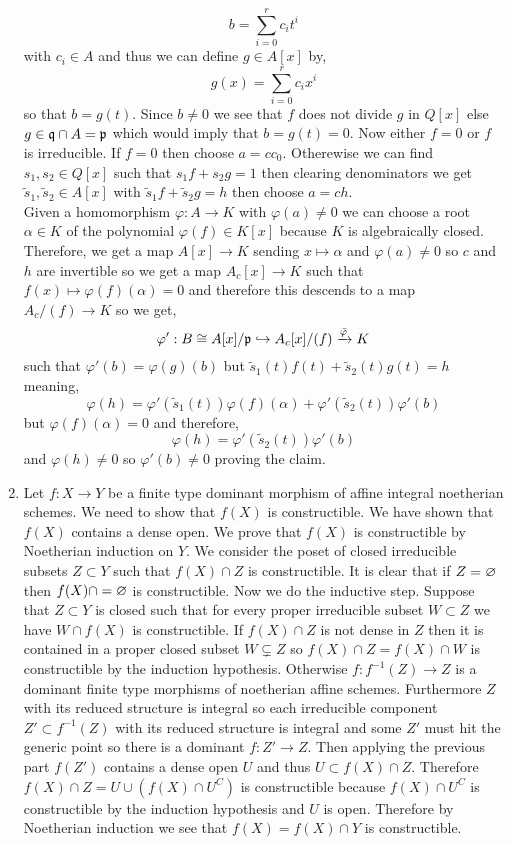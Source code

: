\documentclass[12pt]{article}
\begin{document}
\begin{enumerate}
\[ b = \sum_{i = 0}^r c_i t^i \]
with $c_i \in A$ and thus we can define $g \in A[x]$ by,
\[ g(x) = \sum_{i = 0}^r c_i x^i \]
so that $b = g(t)$. Since $b \neq 0$ we see that $f$ does not divide $g$ in $Q[x]$ else $g \in \mathfrak{q} \cap A = \mathfrak{p}$ which would imply that $b = g(t) = 0$. Now either $f = 0$ or $f$ is irreducible. If $f = 0$ then choose $a = c c_0$. Otherewise we can find $s_1, s_2 \in Q[x]$ such that $s_1 f + s_2 g = 1$ then clearing denominators we get $\tilde{s}_1, \tilde{s}_2 \in A[x]$ with $\tilde{s}_1 f + \tilde{s}_2 g = h$ then choose $a = ch$.
\bigskip\\
Given a homomorphism $\varphi : A \to K$ with $\varphi(a) \neq 0$ we can choose a root $\alpha \in K$ of the polynomial $\varphi(f) \in K[x]$ because $K$ is algebraically closed. Therefore, we get a map $A[x] \to K$ sending $x \mapsto \alpha$ and $\varphi(a) \neq 0$ so $c$ and $h$ are invertible so we get a map $A_c[x] \to K$ such that $f(x) \mapsto \varphi(f)(\alpha) = 0$ and therefore this descends to a map $A_c / (f) \to K$ so we get,
\[ \varphi' : B \cong A[x]/\mathfrak{p} \hookrightarrow A_c[x]/(f) \xrightarrow{\bar{\varphi}} K \]
such that $\varphi'(b) = \varphi(g)(b)$ but $\tilde{s}_1(t) f(t) + \tilde{s}_2(t) g(t) = h$ meaning,
\[ \varphi(h) = \varphi'(\tilde{s}_1(t)) \varphi(f)(\alpha) + \varphi'(\tilde{s}_2(t)) \varphi'(b) \]
but $\varphi(f)(\alpha) = 0$ and therefore,
\[ \varphi(h) = \varphi'(\tilde{s}_2(t)) \varphi'(b) \]
and $\varphi(h) \neq 0$ so $\varphi'(b) \neq 0$ proving the claim.

\item Let $f : X \to Y$ be a finite type dominant morphism of affine integral noetherian schemes. We need to show that $f(X)$ is constructible. We have shown that $f(X)$ contains a dense open. We prove that $f(X)$ is constructible by Noetherian induction on $Y$. We consider the poset of closed irreducible subsets $Z \subset Y$ such that $f(X) \cap Z$ is constructible. It is clear that if $Z = \varnothing$ then $f(X) \cap = \varnothing$ is constructible. Now we do the inductive step. Suppose that $Z \subset Y$ is closed such that for every proper irreducible subset $W \subset Z$ we have $W \cap f(X)$ is constructible. If $f(X) \cap Z$ is not dense in $Z$ then it is contained in a proper closed subset $W \subsetneq Z$ so $f(X) \cap Z = f(X) \cap W$ is constructible by the induction hypothesis. Otherwise $f : f^{-1}(Z) \to Z$ is a dominant finite type morphisms of noetherian affine schemes. Furthermore $Z$ with its reduced structure is integral so each irreducible component $Z' \subset f^{-1}(Z)$ with its reduced structure is integral and some $Z'$ must hit the generic point so there is a dominant $f : Z' \to Z$. Then applying the previous part $f(Z')$ contains a dense open $U$ and thus $U \subset f(X) \cap Z$. Therefore $f(X) \cap Z = U \cup (f(X) \cap U^C)$ is constructible because $f(X) \cap U^C$ is constructible by the induction hypothesis and $U$ is open. Therefore by Noetherian induction we see that $f(X) = f(X) \cap Y$ is constructible.


\end{enumerate}
\end{document}
